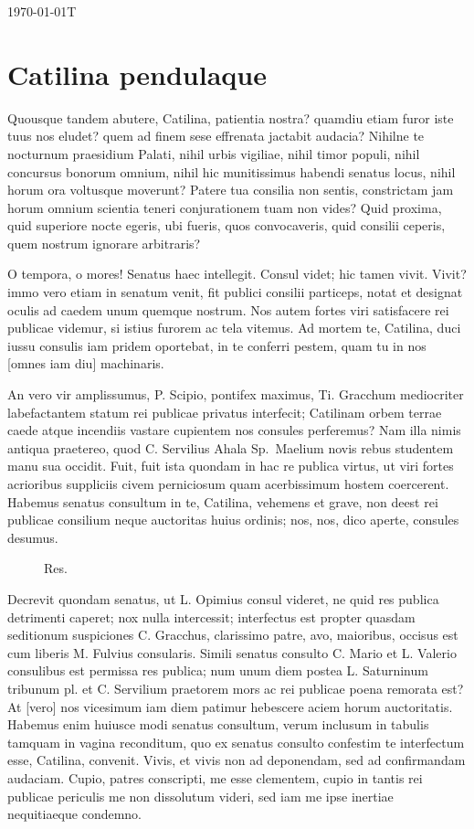 \documentclass[12pt, twoside]{article}
\begin{document}
%
\noindent
\today T\currenttime
\section*{Catilina pendulaque}
Quousque tandem abutere, Catilina, patientia nostra? quamdiu etiam furor iste tuus nos eludet? quem ad finem sese effrenata jactabit audacia? Nihilne te nocturnum praesidium Palati, nihil urbis vigiliae, nihil timor populi, nihil concursus bonorum omnium, nihil hic munitissimus habendi senatus locus, nihil horum ora voltusque moverunt? Patere tua consilia non sentis, constrictam jam horum omnium scientia teneri conjurationem tuam non vides? Quid proxima, quid superiore nocte egeris, ubi fueris, quos convocaveris, quid consilii ceperis, quem nostrum ignorare arbitraris?

O tempora, o mores! Senatus haec intellegit. Consul videt; hic tamen vivit. Vivit? immo vero etiam in senatum venit, fit publici consilii particeps, notat et designat oculis ad caedem unum quemque nostrum. Nos autem fortes viri satisfacere rei publicae videmur, si istius furorem ac tela vitemus. Ad mortem te, Catilina, duci iussu consulis iam pridem oportebat, in te conferri pestem, quam tu in nos [omnes iam diu] machinaris.

An vero vir amplissumus, P. Scipio, pontifex maximus, Ti. Gracchum mediocriter labefactantem statum rei publicae privatus interfecit; Catilinam orbem terrae caede atque incendiis vastare cupientem nos consules perferemus? Nam illa nimis antiqua praetereo, quod C. Servilius Ahala Sp.\ Maelium novis rebus studentem manu sua occidit. Fuit, fuit ista quondam in hac re publica virtus, ut viri fortes acrioribus suppliciis civem perniciosum quam acerbissimum hostem coercerent. Habemus senatus consultum in te, Catilina, vehemens et grave, non deest rei publicae consilium neque auctoritas huius ordinis; nos, nos, dico aperte, consules desumus.

\begin{figure}
\FigureComplexThingThatYouCantVisualise
\caption{Res.}
\end{figure}

Decrevit quondam senatus, ut L. Opimius consul videret, ne quid res publica detrimenti caperet; nox nulla intercessit; interfectus est propter quasdam seditionum suspiciones C. Gracchus, clarissimo patre, avo, maioribus, occisus est cum liberis M. Fulvius consularis. Simili senatus consulto C. Mario et L. Valerio consulibus est permissa res publica; num unum diem postea L. Saturninum tribunum pl. et C. Servilium praetorem mors ac rei publicae poena remorata est? At [vero] nos vicesimum iam diem patimur hebescere aciem horum auctoritatis. Habemus enim huiusce modi senatus consultum, verum inclusum in tabulis tamquam in vagina reconditum, quo ex senatus consulto confestim te interfectum esse, Catilina, convenit. Vivis, et vivis non ad deponendam, sed ad confirmandam audaciam. Cupio, patres conscripti, me esse clementem, cupio in tantis rei publicae periculis me non dissolutum videri, sed iam me ipse inertiae nequitiaeque condemno.
\end{document}
